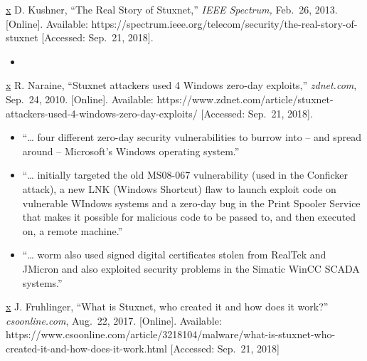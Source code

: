 \documentclass[11pt]{article}
\providecommand{\tightlist}{%
      \setlength{\itemsep}{0pt}\setlength{\parskip}{0pt}}
\begin{document}
\href{https://www.ted.com/talks/ralph_langner_cracking_stuxnet_a_21st_century_cyberweapon}{x}
D. Kushner, ``The Real Story of Stuxnet,'' \emph{IEEE Spectrum,}
Feb.~26, 2013. {[}Online{]}. Available:
https://spectrum.ieee.org/telecom/security/the-real-story-of-stuxnet
{[}Accessed: Sep.~21, 2018{]}.

\begin{itemize}
\item
\end{itemize}

\href{https://www.ted.com/talks/ralph_langner_cracking_stuxnet_a_21st_century_cyberweapon}{x}
R. Naraine, ``Stuxnet attackers used 4 Windows zero-day exploits,''
\emph{zdnet.com}, Sep.~24, 2010. {[}Online{]}. Available:
https://www.zdnet.com/article/stuxnet-attackers-used-4-windows-zero-day-exploits/
{[}Accessed: Sep.~21, 2018{]}.

\begin{itemize}
\tightlist
\item
  ``\ldots{} four different zero-day security vulnerabilities to burrow
  into -- and spread around -- Microsoft's Windows operating system.''
\item
  ``\ldots{} initially targeted the old MS08-067 vulnerability (used in
  the Conficker attack), a new LNK (Windows Shortcut) flaw to launch
  exploit code on vulnerable WIndows systems and a zero-day bug in the
  Print Spooler Service that makes it possible for malicious code to be
  passed to, and then executed on, a remote machine.''
\item
  ``\ldots{} worm also used signed digital certificates stolen from
  RealTek and JMicron and also exploited security problems in the
  Simatic WinCC SCADA systems.''
\end{itemize}

\href{https://www.ted.com/talks/ralph_langner_cracking_stuxnet_a_21st_century_cyberweapon}{x}
J. Fruhlinger, ``What is Stuxnet, who created it and how does it work?''
\emph{csoonline.com}, Aug.~22, 2017. {[}Online{]}. Available:
https://www.csoonline.com/article/3218104/malware/what-is-stuxnet-who-created-it-and-how-does-it-work.html
{[}Accessed: Sep.~21, 2018{]}
\end{document}
